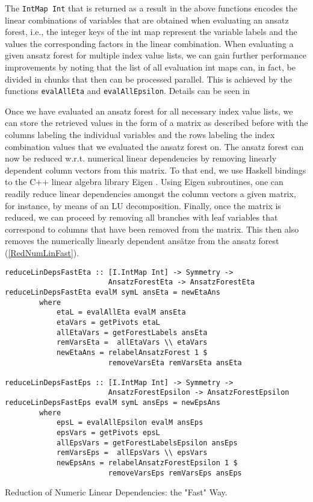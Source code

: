The \texttt{IntMap Int} that is returned as a result in the above functions encodes the linear combinations of variables that are obtained when evaluating an ansatz forest, i.e., the integer keys of the int map represent the variable labels and the values the corresponding factors in the linear combination. 
When evaluating a given ansatz forest for multiple index value lists, we can gain further performance improvements by noting that the list of all evaluation int maps can, in fact, be divided in chunks that then can be processed parallel. This is achieved by the functions \texttt{evalAllEta} and \texttt{evalAllEpsilon}. Details can be seen in \cite{sparse-tensor}

Once we have evaluated an ansatz forest for all necessary index value lists, we can store the retrieved values in the form of a matrix as described before with the columns labeling the individual variables and the rows labeling the index combination values that we evaluated the ansatz forest on. The ansatz forest can now be reduced w.r.t. numerical linear dependencies by removing linearly dependent column vectors from this matrix. To that end, we use Haskell bindings \cite{HackageEigen} to the C++ linear algebra library Eigen \cite{eigenweb}. Using Eigen subroutines, one can readily reduce linear dependencies amongst the column vectors a given matrix, for instance, by means of an LU decomposition. Finally, once the matrix is reduced, we can proceed by removing all branches with leaf variables that correspond to columns that have been removed from the matrix. This then also removes the numerically linearly dependent ansätze from the ansatz forest (\ref{RedNumLinFast}).
\begin{listing}[hbt!]
\begin{verbatim}
reduceLinDepsFastEta :: [I.IntMap Int] -> Symmetry ->
                        AnsatzForestEta -> AnsatzForestEta
reduceLinDepsFastEta evalM symL ansEta = newEtaAns
        where
            etaL = evalAllEta evalM ansEta
            etaVars = getPivots etaL
            allEtaVars = getForestLabels ansEta
            remVarsEta =  allEtaVars \\ etaVars
            newEtaAns = relabelAnsatzForest 1 $
                        removeVarsEta remVarsEta ansEta

reduceLinDepsFastEps :: [I.IntMap Int] -> Symmetry ->
                        AnsatzForestEpsilon -> AnsatzForestEpsilon
reduceLinDepsFastEps evalM symL ansEps = newEpsAns
        where
            epsL = evalAllEpsilon evalM ansEps
            epsVars = getPivots epsL
            allEpsVars = getForestLabelsEpsilon ansEps
            remVarsEps =  allEpsVars \\ epsVars
            newEpsAns = relabelAnsatzForestEpsilon 1 $
                        removeVarsEps remVarsEps ansEps 
\end{verbatim} 
\caption{Reduction of Numeric Linear Dependencies: the "Fast" Way.}\label{RedNumLinFast}
\end{listing}


